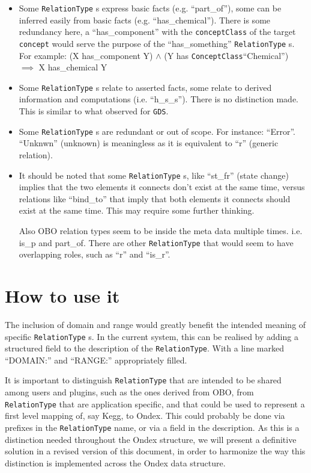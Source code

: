 \documentclass[a4paper,10pt]{article}
\newcommand{\term}[1]{\texttt{#1}\xspace}
\newcommand{\rt}{\term{RelationType}}
\newcommand{\cc}{\term{ConceptClass}}
\begin{document}
\begin{itemize}
\item Some \rt s express basic facts (e.g. ``part\_of''), some can be inferred easily from basic facts (e.g. ``has\_chemical''). There is some redundancy here, a ``has\_component'' with the \term{conceptClass} of the target \term{concept} would serve the purpose of the ``has\_something'' \rt s.
\vskip 0.4cm
\noindent
For example:
\newline
(X has\_component Y) $\wedge$ (Y has \cc ``Chemical'') \\ $\implies$ X has\_chemical Y


\item Some \rt s relate to asserted facts, some relate to derived information and computations (i.e. ``h\_s\_s''). There is no distinction made. This is similar to what observed for \term{GDS}.

\item Some \rt s are redundant or out of scope. For instance: ``Error''. ``Unknwn'' (unknown) is meaningless as it is equivalent to ``r'' (generic relation).

\item It should be noted that some \rt s, like ``st\_fr'' (state change) implies that the two elements it connects don't exist at the same time, versus relations like ``bind\_to'' that imply that both elements it connects should exist at the same time. This may require some further thinking.


Also OBO relation types seem to be inside the meta data multiple times. i.e. is\_p and part\_of. There are other \rt that would seem to have overlapping roles, such as ``r'' and ``is\_r''.

\end{itemize}


\section{How to use it}
The inclusion of domain and range would greatly benefit the intended meaning of specific \rt s.
\vskip 0.4cm
\noindent
In the current system, this can be realised by adding a structured field to the description of the \rt. With a line marked ``DOMAIN:'' and ``RANGE:'' appropriately filled.
\vskip 0.4cm

It is important to distinguish \rt that are intended to be shared among users and plugins, such as the ones derived from OBO, from \rt that are application specific, and that could be used to represent a first level mapping of, say Kegg, to Ondex.
This could probably be done via prefixes in the \rt name, or via a field in the description.
As this is a distinction needed throughout the Ondex structure, we will present a definitive solution in a revised version of this document, in order to harmonize the way this distinction is implemented across the Ondex data structure.
\end{document}
